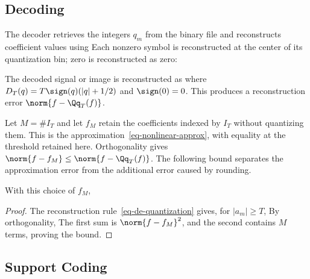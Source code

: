                                                                  
\subsection{Decoding}

The decoder retrieves the integers $q_m$ from the binary file and reconstructs coefficient values using
Each nonzero symbol is reconstructed at the center of its quantization bin; zero is reconstructed as zero:
\begin{center}
\end{center}

The decoded signal or image is reconstructed as
where $D_T(q)=T\sign(q)(|q|+1/2)$ and $\sign(0)=0$. This produces a reconstruction error $\norm{f-\Qq_T(f)}$.

Let $M=\#I_T$ and let $f_M$ retain the coefficients indexed by $I_T$ without quantizing them. This is the approximation~\eqref{eq-nonlinear-approx}, with equality at the threshold retained here. Orthogonality gives $\norm{f-f_M} \leq \norm{f-\Qq_T(f)}$. The following bound separates the approximation error from the additional error caused by rounding.

\begin{prop}\label{prop-error-compression}
	With this choice of $f_M$,
\end{prop}

\begin{proof}
The reconstruction rule~\eqref{eq-de-quantization} gives, for $|a_m|\geq T$,
By orthogonality,
The first sum is $\norm{f-f_M}^2$, and the second contains $M$ terms, proving the bound.
\end{proof}


                                        
\subsection{Support Coding}
\label{subsec-support-coding}


